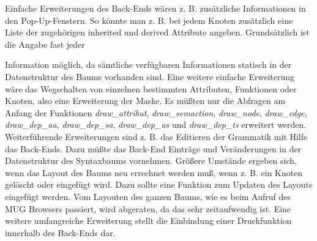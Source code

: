 Einfache Erweiterungen des Back-Ends w\"aren z. B. zus\"atzliche Informationen in den Pop-Up-Fenstern. So k\"onnte man z. B. bei jedem Knoten zus\"atzlich eine Liste der zugeh\"origen inherited und derived Attribute angeben. Grunds\"atzlich ist die Angabe fast jeder



 Information m\"oglich, da s\"amtliche verf\"ugbaren Informationen statisch in der Datenstruktur des Baums vorhanden sind.
Eine weitere einfache Erweiterung w\"are das Wegschalten von einzelnen bestimmten Attributen, Funktionen oder Knoten, also eine Erweiterung der Maske.
Es m\"u\ss{}ten nur die Abfragen am Anfang der Funktionen {\it draw\_attribut}, {\it draw\_semaction}, {\it draw\_node}, {\it draw\_edge},
{\it draw\_dep\_aa}, {\it draw\_dep\_sa}, {\it draw\_dep\_as} und {\it draw\_dep\_ts} erweitert werden. Weiterf\"uhrende Erweiterungen sind z. B. das
Editieren der Grammatik mit Hilfe das Back-Ends. Dazu m\"u\ss{}te das Back-End Eintr\"age und Ver\"anderungen in der Datenstruktur des Syntaxbaums vornehmen.
Gr\"o\ss{}ere Umst\"ande ergeben sich, wenn das Layout des Baums neu errechnet werden mu\ss{}, wenn z. B. ein Knoten gel\"oscht oder eingef\"ugt wird. Dazu sollte
eine Funktion zum Updaten des Layouts eingef\"ugt werden. Vom Layouten des ganzen Baums, wie es beim Aufruf des MUG Browsers passiert, wird abgeraten,
da das sehr zeitaufwendig ist. Eine weitere umfangreiche Erweiterung stellt die Einbindung einer Druckfunktion innerhalb des Back-Ends dar.




